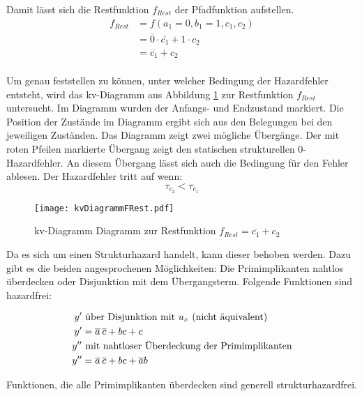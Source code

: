 Damit lässt sich die Restfunktion $f_{Rest}$ der Pfadfunktion aufstellen.
\begin{align*}
f_{Rest} &= f(a_1=0,b_1=1,c_1,c_2) \\ 
         &= \overline{0} \cdot \overline{c_1}  + 1 \cdot c_2 \\
         &= \overline{c_1} + c_2 \\
\end{align*}

Um genau feststellen zu können, unter welcher Bedingung der Hazardfehler entsteht, wird das {\sc kv}-Diagramm aus Abbildung \ref{kvFRest} zur Restfunktion $f_{Rest}$ untersucht. Im Diagramm wurden der Anfangs- und Endzustand markiert. Die Position der Zustände im Diagramm ergibt sich aus den Belegungen bei den jeweiligen Zuständen. Das Diagramm zeigt zwei mögliche Übergänge. Der mit roten Pfeilen markierte Übergang zeigt den statischen strukturellen 0-Hazardfehler. An diesem Übergang lässt sich auch die Bedingung für den Fehler ablesen. Der Hazardfehler tritt auf wenn:
$$\tau_{c_2} < \tau_{c_1}$$
\begin{figure}[htp]
	\centering
	\texttt{[image: kvDiagrammFRest.pdf]}
	\caption{{\sc kv}-Diagramm Diagramm zur Restfunktion $f_{Rest} = \overline{c_1} + c_2$}
	\label{kvFRest} 
\end{figure} 

Da es sich um einen Strukturhazard handelt, kann dieser behoben werden. Dazu gibt es die beiden angesprochenen Möglichkeiten: Die Primimplikanten nahtlos überdecken oder Disjunktion mit dem Übergangsterm. Folgende Funktionen sind hazardfrei:

\begin{align*}
y'  &\textnormal{ über Disjunktion mit $u_x$ (nicht äquivalent) } \\ 
y'  &= \overline{a}\hspace{2pt}\overline{c}  + bc + c  \\
y'' &\textnormal{ mit nahtloser Überdeckung der Primimplikanten} \\
y'' &= \overline{a}\hspace{2pt}\overline{c}  + bc + \overline{a}b \\
\end{align*}

Funktionen, die alle Primimplikanten überdecken sind generell strukturhazardfrei.




